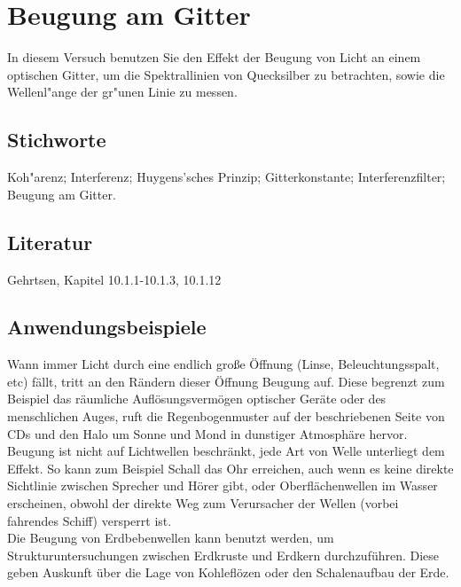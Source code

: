 \chapter{Beugung am Gitter}
\label{v:10}

In diesem Versuch benutzen Sie den Effekt der Beugung von Licht an einem optischen Gitter, um die Spektrallinien von Quecksilber zu betrachten, sowie die Wellenl"ange der gr"unen Linie zu messen.\\

\section{Stichworte}

Koh"arenz; Interferenz; Huygens'sches Prinzip; Gitterkonstante; Interferenzfilter; Beugung am Gitter.
%
\section{Literatur}

Gehrtsen, Kapitel 10.1.1-10.1.3, 10.1.12
%

\section{Anwendungsbeispiele}

Wann immer Licht durch eine endlich große Öffnung (Linse, Beleuchtungsspalt, etc) fällt, tritt an den Rändern dieser Öffnung Beugung auf. Diese begrenzt zum Beispiel das räumliche Auflösungsvermögen optischer Geräte oder des menschlichen Auges, ruft die Regenbogenmuster auf der beschriebenen Seite von CDs und den Halo um Sonne und Mond in dunstiger Atmosphäre hervor.\\
Beugung ist nicht auf Lichtwellen beschränkt, jede Art von Welle unterliegt dem Effekt. So kann zum Beispiel Schall das Ohr erreichen, auch wenn es keine direkte Sichtlinie zwischen Sprecher und Hörer gibt, oder Oberflächenwellen im Wasser erscheinen, obwohl der direkte Weg zum Verursacher der Wellen (vorbei fahrendes Schiff) versperrt ist.\\
Die Beugung von Erdbebenwellen kann benutzt werden, um Strukturuntersuchungen zwischen Erdkruste und Erdkern durchzuführen. Diese geben Auskunft über die Lage von Kohleflözen oder den Schalenaufbau der Erde.


